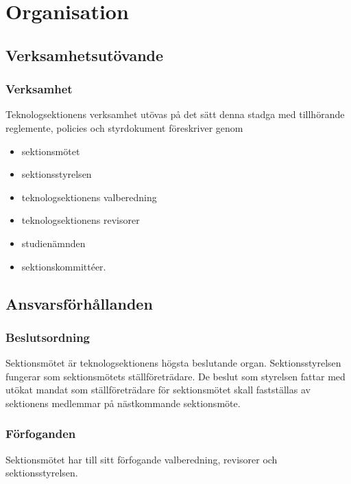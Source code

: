 \section{Organisation}

\subsection{Verksamhetsutövande}

\subsubsection{Verksamhet}
Teknologsektionens verksamhet utövas på det sätt denna stadga med tillhörande reglemente, policies och styrdokument föreskriver genom

\begin{itemize}
	\item sektionsmötet
	\item sektionsstyrelsen \STYRIT{}
	\item teknologsektionens valberedning
	\item teknologsektionens revisorer
	\item studienämnden \SNIT{}
	\item sektionskommittéer.
\end{itemize}

\subsection{Ansvarsförhållanden}

\subsubsection{Beslutsordning}
Sektionsmötet är teknologsektionens högsta beslutande organ. Sektionsstyrelsen fungerar som sektionsmötets ställföreträdare. De beslut som styrelsen fattar med utökat mandat som ställföreträdare för sektionsmötet skall fastställas av sektionens medlemmar på nästkommande sektionsmöte.

\subsubsection{Förfoganden}
Sektionsmötet har till sitt förfogande valberedning, revisorer och sektionsstyrelsen.

